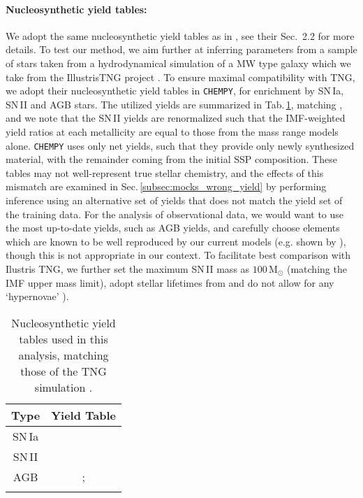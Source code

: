 \documentclass{aa}
\begin{document}
\paragraph{Nucleosynthetic yield tables:}
We adopt the same nucleosynthetic yield tables as in \citep{Philcox_2019}, see their Sec.~2.2 for more details.
To test our method, we aim further at inferring parameters from a sample of stars taken from a hydrodynamical simulation of a MW type galaxy which we take from the IllustrisTNG project \citep{Pillepich2018}. To ensure maximal compatibility with TNG, we adopt their nucleosynthetic yield tables in \texttt{CHEMPY}, for enrichment by SN\,Ia, SN\,II and AGB stars. The utilized yields are summarized in Tab.\,\ref{tab:chempy_TNG_yields}, matching \citet[Tab.\,2]{2018MNRAS.473.4077P}, and we note that the SN\,II yields are renormalized such that the IMF-weighted yield ratios at each metallicity are equal to those from the \citet{2006ApJ...653.1145K} mass range models alone. \texttt{CHEMPY} uses only net yields, such that they provide only newly synthesized material, with the remainder coming from the initial SSP composition. These tables may not well-represent true stellar chemistry, and the effects of this mismatch are examined in Sec.\,\ref{subsec:mocks_wrong_yield} by performing inference using an alternative set of yields that does not match the yield set of the training data. For the analysis of observational data, we would want to use the most up-to-date yields, such as \citet{2016ApJ...825...26K} AGB yields, and carefully choose elements which are known to be well reproduced by our current models (e.g. shown by \citet{2019ApJ...874..102W,2019arXiv190806113G}), though this is not appropriate in our context. To facilitate best comparison with Ilustris TNG, we further set the maximum SN\,II mass as $100\,\mathrm{M}_\odot$ (matching the IMF upper mass limit), adopt stellar lifetimes from \citet{portinari} and do not allow for any `hypernovae' \citep[in contrary to][]{2018ApJ...861...40P}).

\begin{table}[]
\caption{Nucleosynthetic yield tables used in this analysis, matching those of the TNG simulation \citep[Tab.\,2]{2018MNRAS.473.4077P}.}
     \centering
     \begin{tabular}{c|c}
       Type & Yield Table \\
        \hline
         SN\,Ia & \citet{1997NuPhA.621..467N}\\
         SN\,II & \citet{2006ApJ...653.1145K,portinari}\\
         AGB & \citet{2010MNRAS.403.1413K,2014MNRAS.437..195D};\\
         & \citet{2014ApJ...797...44F}
     \end{tabular}
 \label{tab:chempy_TNG_yields}
 \end{table}
\end{document}
